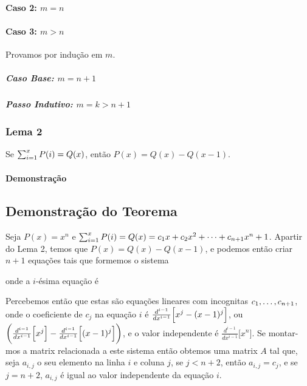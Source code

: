 \documentclass[a4paper, 10pt]{article}
\begin{document}
\lemmaOneCaseOneInduction
\paragraph{Caso 2: $m = n$}

\lemmaOneCaseTwo
\paragraph{Caso 3: $m > n$}
 
Provamos por indu\c{c}\~ao em $m$.

\subparagraph{Caso Base: $m = n + 1$}

\lemmaOneCaseThreeBase

\subparagraph{Passo Indutivo: $m = k > n + 1$}

\lemmaOneCaseThreeInduction
 
\pagebreak
\subsubsection{Lema 2}

Se $\sum_{i=1}^{x}P(i) = Q(x)$, ent\~ao $P(x) = Q(x) - Q(x-1)$.

\paragraph{Demonstra\c{c}\~ao}

\lemmaTwo

\pagebreak

\subsection{Demonstra\c{c}\~ao do Teorema}

Seja $P(x) = x^n$ e $\sum_{i=1}^{x}P(i) = Q(x) = c_1x + c_2x^2 + \cdots + c_{n+1}x^n+1$. Apartir do Lema 2, temos que $P(x) = Q(x) - Q(x-1)$, e podemos ent\~ao criar $n+1$ equa\c{c}\~oes tais que formemos o sistema

\diffEquationSystem

onde a $i$-\'esima equa\c{c}\~ao \'e

\ithEquation

Percebemos ent\~ao que estas s\~ao equa\c{c}\~oes lineares com incognitas $c_1,\ldots,c_{n+1}$, onde o coeficiente de $c_j$ na equa\c{c}\~ao $i$ \'e $\frac{d^{i-1}}{dx^{i-1}}\Big[x^j - (x - 1)^j\Big]$, ou $\bigg(\frac{d^{i-1}}{dx^{i-1}}\Big[x^j\Big] - \frac{d^{i-1}}{dx^{i-1}}\Big[(x - 1)^j\Big]\bigg)$, e o valor independente \'e $\frac{d^{i-1}}{dx^{i-1}}\Big[x^n\Big]$. Se montar-mos a matrix relacionada a este sistema ent\~ao obtemos uma matrix $A$ tal que, seja $a_{i,j}$ o seu elemento na linha $i$ e coluna $j$, se $j < n + 2$, ent\~ao $a_{i,j} = c_j$, e se $j = n+2$, $a_{i,j}$ \'e igual ao valor independente da equa\c{c}\~ao $i$.\\
\end{document}
